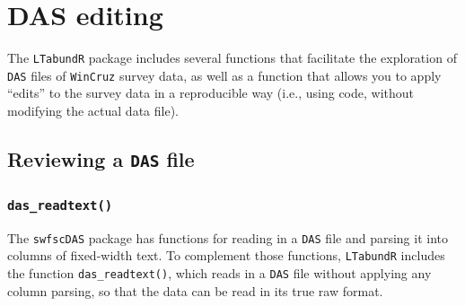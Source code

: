 \documentclass[
]{book}
\begin{document}
\hypertarget{das}{%
\chapter{DAS editing}\label{das}}

The \texttt{LTabundR} package includes several functions that facilitate the exploration of \texttt{DAS} files of \texttt{WinCruz} survey data, as well as a function that allows you to apply ``edits'' to the survey data in a reproducible way (i.e., using code, without modifying the actual data file).

\hypertarget{reviewing-a-das-file}{%
\section*{\texorpdfstring{Reviewing a \texttt{DAS} file}{Reviewing a DAS file}}\label{reviewing-a-das-file}}

\hypertarget{das_readtext}{%
\subsection*{\texorpdfstring{\texttt{das\_readtext()}}{das\_readtext()}}\label{das_readtext}}

The \texttt{swfscDAS} package has functions for reading in a \texttt{DAS} file and parsing it into columns of fixed-width text. To complement those functions, \texttt{LTabundR} includes the function \texttt{das\_readtext()}, which reads in a \texttt{DAS} file without applying any column parsing, so that the data can be read in its true raw format.
\end{document}
